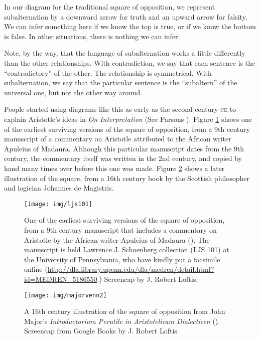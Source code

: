 In our diagram for the traditional square of opposition, we represent subalternation by a downward arrow for truth and an upward arrow for falsity. We can infer something here if we know the top is true, or if we know the bottom is false. In other situations, there is nothing we can infer. 

Note, by the way, that the language of subalternation works a little differently than the other relationships. With contradiction, we say that each sentence is the ``contradictory'' of the other. The relationship is symmetrical. With subalternation, we say that the particular sentence is the ``subaltern'' of the universal one, but not the other way around.  

People started using diagrams like this as early as the second century \textsc{ce} to explain Aristotle's ideas in \textit{On Interpretation} (See Parsons \cite*{Parsons1997}). Figure \ref{fig:apuleiussquare} shows one of the earliest surviving versions of the square of opposition, from a 9th century manuscript of a commentary on Aristotle attributed to the African writer Apuleius of Madaura. Although this particular manuscript dates from the 9th century, the commentary itself was written in the 2nd century, and copied by hand many times over before this one was made. Figure \ref{fig:majorsquare} shows a later illustration of the square, from a 16th century book by the Scottish philosopher and logician Johannes de Magistris.

\begin{figure}
\begin{mdframed}[style=mytableclearbox]
\begin{center}
\texttt{[image: img/ljs101]}
\end{center}
\end{mdframed}
\caption{One of the earliest surviving versions of the square of opposition, from a 9th century manuscript that includes a commentary on Aristotle by the African writer Apuleius of Madaura (\cite{Apuleius1987}). The manuscript is held Lawrence J. Schoenberg collection (LJS 101) at the University of Pennsylvania, who have kindly put a facsimile online (\url{http://dla.library.upenn.edu/dla/medren/detail.html?id=MEDREN_5186550}.)  Screencap by J. Robert Loftis.}
\label{fig:apuleiussquare}
\end{figure}


\begin{figure}
\begin{mdframed}[style=mytableclearbox]
\begin{center}
\texttt{[image: img/majorvenn2]}
\end{center}
\end{mdframed}
\caption{A 16th century illustration of the square of opposition from John Major's \textit{Introductorium Perutile in Aristotelicam Dialecticen} (\cite*[fol.L]{Major1527}). Screencap from Google Books by J.  Robert Loftis.}
\label{fig:majorsquare}
\end{figure}

